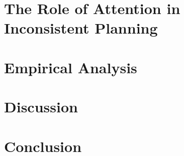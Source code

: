 \documentclass[
  12pt,
]{article}
\begin{document}
\hypertarget{the-role-of-attention-in-inconsistent-planning}{%
\section{The Role of Attention in Inconsistent
Planning}\label{the-role-of-attention-in-inconsistent-planning}}

\hypertarget{empirical-analysis}{%
\section{Empirical Analysis}\label{empirical-analysis}}

\hypertarget{discussion}{%
\section{Discussion}\label{discussion}}

\hypertarget{conclusion}{%
\section{Conclusion}\label{conclusion}}

\renewcommand\refname{Reference}
  
\end{document}
